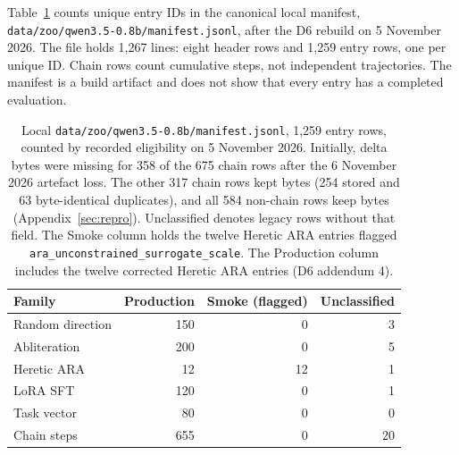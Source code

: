 Table~\ref{tab:zoo-counts} counts unique entry IDs in the canonical local manifest, \texttt{data/zoo/qwen3.5-0.8b/manifest.jsonl}, after the D6 rebuild on 5 November 2026. The file holds 1,267 lines: eight header rows and 1,259 entry rows, one per unique ID. Chain rows count cumulative steps, not independent trajectories. The manifest is a build artifact and does not show that every entry has a completed evaluation.
\begin{table}[t]
\centering
\begin{tabular}{lrrr}\toprule
Family & Production & Smoke (flagged) & Unclassified \\\midrule
Random direction & 150 & 0 & 3 \\
Abliteration & 200 & 0 & 5 \\
Heretic ARA & 12 & 12 & 1 \\
LoRA SFT & 120 & 0 & 1 \\
Task vector & 80 & 0 & 0 \\
Chain steps & 655 & 0 & 20 \\\bottomrule
\end{tabular}
\caption{Local \texttt{data/zoo/qwen3.5-0.8b/manifest.jsonl}, 1,259 entry rows, counted by recorded eligibility on 5 November 2026. %
Initially, delta bytes were missing for 358 of the 675 chain rows after the 6 November 2026 artefact loss. The other 317 chain rows kept bytes (254 stored and 63 byte-identical duplicates), and all 584 non-chain rows keep bytes (Appendix~\ref{sec:repro}).
Unclassified denotes legacy rows without that field. The Smoke column holds the twelve Heretic ARA entries flagged \texttt{ara\_unconstrained\_surrogate\_scale}. The Production column includes the twelve corrected Heretic ARA entries (D6 addendum 4).}
\label{tab:zoo-counts}
\end{table}

